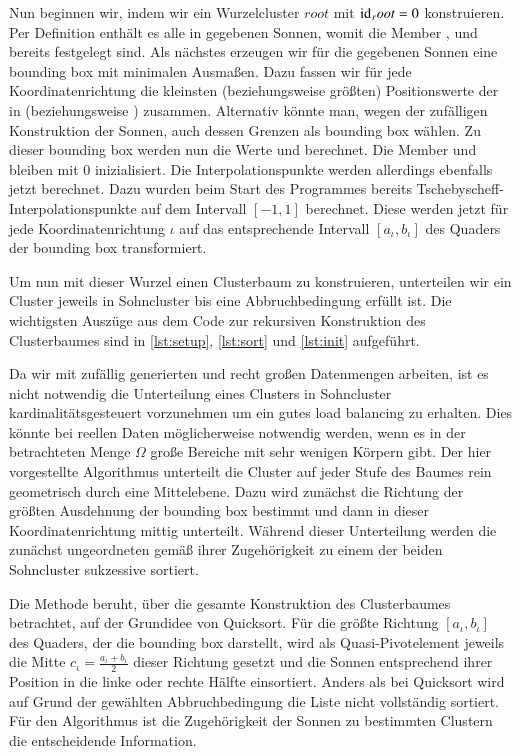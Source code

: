     Nun beginnen wir, indem wir ein Wurzelcluster $root$ mit $\tcode{id}_root = 0$ konstruieren. Per Definition enthält es alle in  gegebenen Sonnen, womit die Member ,  und 
     bereits festgelegt sind. Als nächstes erzeugen wir für die gegebenen Sonnen eine bounding box mit minimalen Ausmaßen. Dazu fassen wir für jede Koordinatenrichtung die kleinsten 
    (beziehungsweise größten) Positionswerte der  in  (beziehungsweise ) zusammen. Alternativ könnte man, wegen der zufälligen Konstruktion der Sonnen, auch dessen 
    Grenzen als bounding box wählen. Zu dieser bounding box werden nun die Werte \mbox{} und  berechnet. Die Member  und  bleiben mit $0$ 
    inizialisiert. Die Interpolationspunkte  werden allerdings ebenfalls jetzt berechnet. Dazu wurden beim Start des Programmes bereits Tschebyscheff-Interpolationspunkte auf dem Intervall 
    $[-1,1]$ berechnet. Diese werden jetzt für jede Koordinatenrichtung $\iota$ auf das entsprechende Intervall $[a_\iota, b_\iota]$ des Quaders der bounding box transformiert.
    
    Um nun mit dieser Wurzel einen Clusterbaum zu konstruieren, unterteilen wir ein Cluster jeweils in Sohncluster bis eine Abbruchbedingung erfüllt ist. 
    Die wichtigsten Auszüge aus dem Code zur rekursiven Konstruktion des Clusterbaumes sind in \autoref{lst:setup}, \autoref{lst:sort} und \autoref{lst:init} aufgeführt.
    
    Da wir mit zufällig generierten und recht großen Datenmengen arbeiten, ist es nicht notwendig die Unterteilung eines Clusters in Sohncluster kardinalitätsgesteuert vorzunehmen um ein gutes load 
    balancing zu erhalten. Dies könnte bei reellen Daten möglicherweise notwendig werden, wenn es in der betrachteten Menge $\Omega$ große Bereiche mit sehr wenigen Körpern gibt. 
    Der hier vorgestellte Algorithmus unterteilt die Cluster auf jeder Stufe des Baumes rein geometrisch durch eine Mittelebene. Dazu wird zunächst die Richtung der größten Ausdehnung der bounding
    box bestimmt und dann in dieser Koordinatenrichtung mittig unterteilt. Während dieser Unterteilung werden die zunächst ungeordneten  gemäß ihrer Zugehörigkeit zu einem der beiden
    Sohncluster sukzessive sortiert.
    
    Die Methode  beruht, über die gesamte Konstruktion des Clusterbaumes betrachtet, auf der Grundidee von Quicksort. Für die größte Richtung $[a_\iota, b_\iota]$
    des Quaders, der die bounding box darstellt, wird als Quasi-Pivotelement jeweils die Mitte $c_\iota = \frac{a_\iota + b_\iota}{2}$ dieser Richtung gesetzt und die Sonnen entsprechend ihrer 
    Position in die linke oder rechte Hälfte einsortiert. Anders als bei Quicksort wird auf Grund der gewählten Abbruchbedingung die Liste nicht vollständig sortiert. Für den Algorithmus ist
    die Zugehörigkeit der Sonnen zu bestimmten Clustern die entscheidende Information.
    
